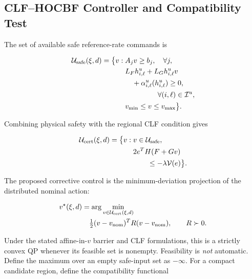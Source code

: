 \documentclass[11pt,twocolumn]{article}
\begin{document}
\subsection{CLF--HOCBF Controller and Compatibility Test}

\label{subsec:qp}

The set of available safe reference-rate commands is

\begin{equation}\label{eq:usafe}
\begin{aligned}
\mathcal U_{\rm safe}(\xi,d)=\big\{v:\;&A_jv\geq b_j,\quad\forall j,\\
&L_Fh^u_{i,\ell}+L_Gh^u_{i,\ell}v\\
&\quad+\alpha^u_{i,\ell}(h^u_{i,\ell})\geq0,\\
&\hspace{16mm}\forall(i,\ell)\in\mathcal I^u,\\
&v_{\min}\leq v\leq v_{\max}\big\}.
\end{aligned}
\end{equation}

Combining physical safety with the regional CLF condition gives

\begin{equation}\label{eq:ucert}
\begin{aligned}
\mathcal U_{\rm cert}(\xi,d)=\big\{v:\;&v\in\mathcal U_{\rm safe},\\
&2e^TH(F+Gv)\\
&\qquad\leq-\lambda\mathcal V(e)\big\}.
\end{aligned}
\end{equation}

The proposed corrective control is the minimum-deviation projection of the distributed nominal action:

\begin{equation}\label{eq:qp}
\begin{aligned}
v^\star(\xi,d)
&=\arg\min_{v\in\mathcal U_{\rm cert}(\xi,d)}\\
&\quad\tfrac12(v-v_{\rm nom})^TR(v-v_{\rm nom}),
\qquad R\succ0.
\end{aligned}
\end{equation}

Under the stated affine-in-$v$ barrier and CLF formulations, this is a strictly convex QP whenever its feasible set is nonempty. Feasibility is \emph{not} automatic. Define the maximum over an empty safe-input set as $-\infty$. For a compact candidate region, define the compatibility functional
\end{document}
